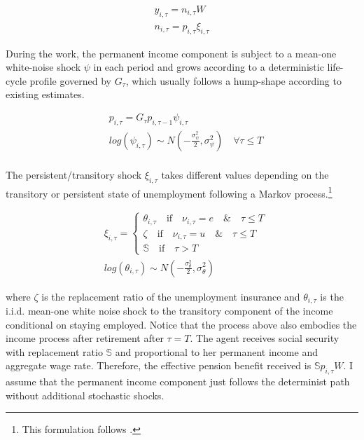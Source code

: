\begin{equation}
\begin{split}
\label{Eq:income_model}
y_{i,\tau} = n_{i,\tau}W \\ 
n_{i,\tau} = p_{i,\tau}\xi_{i,\tau}
\end{split}
\end{equation}

During the work, the permanent income component is subject to a mean-one white-noise shock $\psi$ in each period and grows according to a deterministic life-cycle profile governed by $G_\tau$, which usually follows a hump-shape according to existing estimates. \citep{gourinchas2002consumption}

\begin{equation}
\begin{split}
& p_{i,\tau} = G_\tau p_{i,\tau-1}\psi_{i,\tau} \\
& log (\psi_{i,\tau}) \sim N(-\frac{\sigma^2_{\psi}}{2},\sigma^2_{\psi}) \quad \forall \tau \leq T \\
\end{split}
\end{equation}

The persistent/transitory shock $\xi_{i,\tau}$ takes different values depending on the transitory or persistent state of unemployment following a Markov process.\footnote{This formulation follows \cite{krueger2016macroeconomics}.}  

\begin{equation}
\begin{split}
& \xi_{i,\tau} =   \left\{
\begin{array}{ll}
 \theta_{i,\tau} \quad \text{if} \quad \nu_{i,\tau} =e \quad \& \quad  \tau \leq T \\
      \zeta \quad \text{if} \quad \nu_{i,\tau} = u \quad \& \quad \tau \leq T  \\
      \mathbb{S} \quad \text{if}  \quad \tau > T
\end{array} \right. \\
& log(\theta_{i,\tau}) \sim N(-\frac{\sigma^2_\theta}{2},\sigma^2_\theta)
\end{split}
\end{equation}

where $\zeta$ is the replacement ratio of the unemployment insurance and $\theta_{i,\tau}$ is the i.i.d. mean-one white noise shock to the transitory component of the income conditional on staying employed. Notice that the process above also embodies the income process after retirement after $\tau=T$. The agent receives social security with replacement ratio $\mathbb{S}$ and proportional to her permanent income and aggregate wage rate. Therefore, the effective pension benefit received is $\mathbb{S}p_{i,\tau}W$. I assume that the permanent income component just follows the determinist path without additional stochastic shocks. 

